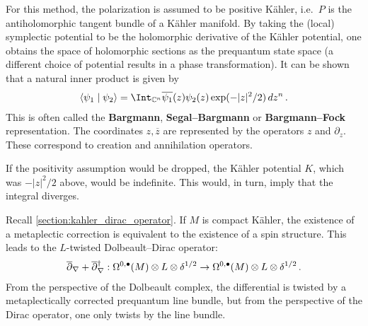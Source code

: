     \begin{example}
        For this method, the polarization is assumed to be positive K\"ahler, i.e.~$P$ is the antiholomorphic tangent bundle of a K\"ahler manifold. By taking the (local) symplectic potential to be the holomorphic derivative of the K\"ahler potential, one obtains the space of holomorphic sections as the prequantum state space (a different choice of potential results in a phase transformation). It can be shown that a natural inner product is given by
        \begin{gather}
            \langle\psi_1\mid\psi_2\rangle = \Int_{\mathbb{C}^n}\overline{\psi_1}(z)\psi_2(z)\exp(-|z|^2/2)\,dz^n\,.
        \end{gather}
        This is often called the \textbf{Bargmann}, \textbf{Segal--Bargmann} or \textbf{Bargmann--Fock} representation. The coordinates $z,\overline{z}$ are represented by the operators $z$ and $\partial_z$. These correspond to creation and annihilation operators.
    \end{example}
    \begin{remark}
        If the positivity assumption would be dropped, the K\"ahler potential $K$, which was $-|z|^2/2$ above, would be indefinite. This would, in turn, imply that the integral diverges.
    \end{remark}
    \begin{remark}
        Recall \cref{section:kahler_dirac_operator}. If $M$ is compact K\"ahler, the existence of a metaplectic correction is equivalent to the existence of a spin structure. This leads to the $L$-twisted Dolbeault--Dirac operator:
        \begin{gather}
            \overline{\partial}_\nabla+\overline{\partial}\vphantom{\partial}_\nabla^\dagger:\Omega^{0,\bullet}(M)\otimes L\otimes\delta^{1/2}\rightarrow\Omega^{0,\bullet}(M)\otimes L\otimes\delta^{1/2}\,.
        \end{gather}
        From the perspective of the Dolbeault complex, the differential is twisted by a metaplectically corrected prequantum line bundle, but from the perspective of the Dirac operator, one only twists by the line bundle.
    \end{remark}

